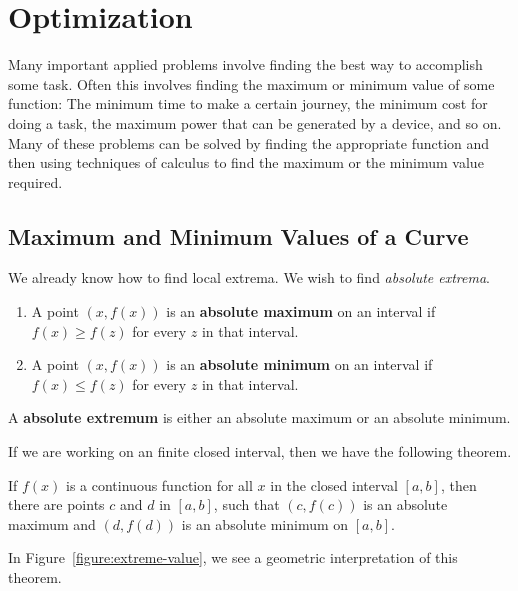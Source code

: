 \chapter{Optimization}




Many important applied problems involve finding the best way to
accomplish some task. Often this involves finding the maximum or
minimum value of some function: The minimum time to make a certain
journey, the minimum cost for doing a task, the maximum power that can
be generated by a device, and so on. Many of these problems can be
solved by finding the appropriate function and then using techniques
of calculus to find the maximum or the minimum value required.


\section{Maximum and Minimum Values of a Curve}

We already know how to find local extrema. We wish to find
\textit{absolute extrema}.

\begin{definition}\hfil{}
\begin{enumerate}
\item A point $(x,f(x))$ is an \textbf{absolute maximum} on an interval
  if $f(x)\ge f(z)$ for every $z$ in that interval.
\item A point $(x,f(x))$ is an \textbf{absolute minimum} on an interval if
  $f(x)\le f(z)$ for every $z$ in that interval.
\end{enumerate}
A \textbf{absolute extremum} is either an
absolute maximum or an absolute minimum.
\end{definition}

If we are working on an finite closed interval, then we have the
following theorem.

\begin{mainTheorem}\label{theorem:evt}
If $f(x)$ is a continuous function for all $x$ in the closed interval
$[a,b]$, then there are points $c$ and $d$ in $[a,b]$, such that
$(c,f(c))$ is an absolute maximum and $(d,f(d))$ is an absolute
minimum on $[a, b]$.
\end{mainTheorem}
In Figure~\ref{figure:extreme-value}, we see a geometric
interpretation of this theorem. 

